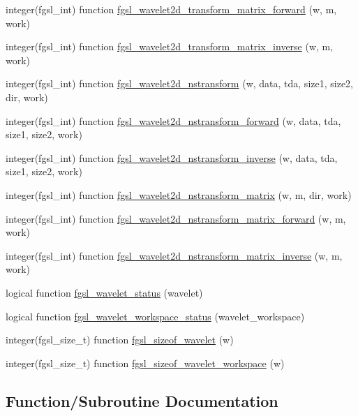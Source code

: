 \begin{DoxyCompactItemize}
\item 
integer(fgsl\+\_\+int) function \hyperlink{wavelet_8finc_a96ce5dd5582a999b163f947e95a1ae40}{fgsl\+\_\+wavelet2d\+\_\+transform\+\_\+matrix\+\_\+forward} (w, m, work)
\item 
integer(fgsl\+\_\+int) function \hyperlink{wavelet_8finc_a9d0bcdfff907e1c19166cddf01fdc15d}{fgsl\+\_\+wavelet2d\+\_\+transform\+\_\+matrix\+\_\+inverse} (w, m, work)
\item 
integer(fgsl\+\_\+int) function \hyperlink{wavelet_8finc_a488377ebb90c0a2cbfddd028be2dc41b}{fgsl\+\_\+wavelet2d\+\_\+nstransform} (w, data, tda, size1, size2, dir, work)
\item 
integer(fgsl\+\_\+int) function \hyperlink{wavelet_8finc_afa1e0433033a7898a4cb3992ac848f88}{fgsl\+\_\+wavelet2d\+\_\+nstransform\+\_\+forward} (w, data, tda, size1, size2, work)
\item 
integer(fgsl\+\_\+int) function \hyperlink{wavelet_8finc_a3424c04dfbf288aebc2d8e5e9164565f}{fgsl\+\_\+wavelet2d\+\_\+nstransform\+\_\+inverse} (w, data, tda, size1, size2, work)
\item 
integer(fgsl\+\_\+int) function \hyperlink{wavelet_8finc_a22dbfeae87b11490a8ecebe3254f85fe}{fgsl\+\_\+wavelet2d\+\_\+nstransform\+\_\+matrix} (w, m, dir, work)
\item 
integer(fgsl\+\_\+int) function \hyperlink{wavelet_8finc_a82cc729239d174d054777ed3b7477260}{fgsl\+\_\+wavelet2d\+\_\+nstransform\+\_\+matrix\+\_\+forward} (w, m, work)
\item 
integer(fgsl\+\_\+int) function \hyperlink{wavelet_8finc_a68e1cc4b337ecb5fef13dbea1b47b33a}{fgsl\+\_\+wavelet2d\+\_\+nstransform\+\_\+matrix\+\_\+inverse} (w, m, work)
\item 
logical function \hyperlink{wavelet_8finc_ae806a3d76e07c7169657aa6541928766}{fgsl\+\_\+wavelet\+\_\+status} (wavelet)
\item 
logical function \hyperlink{wavelet_8finc_abb974e06092a14e00e8d4ad2601c012a}{fgsl\+\_\+wavelet\+\_\+workspace\+\_\+status} (wavelet\+\_\+workspace)
\item 
integer(fgsl\+\_\+size\+\_\+t) function \hyperlink{wavelet_8finc_aa94fb05c91cf6594b1afe524d87ce40e}{fgsl\+\_\+sizeof\+\_\+wavelet} (w)
\item 
integer(fgsl\+\_\+size\+\_\+t) function \hyperlink{wavelet_8finc_a709a83f8f0d23fc64a4933894f474ae1}{fgsl\+\_\+sizeof\+\_\+wavelet\+\_\+workspace} (w)
\end{DoxyCompactItemize}


\subsection{Function/\+Subroutine Documentation}
\hypertarget{wavelet_8finc_aa94fb05c91cf6594b1afe524d87ce40e}{}
